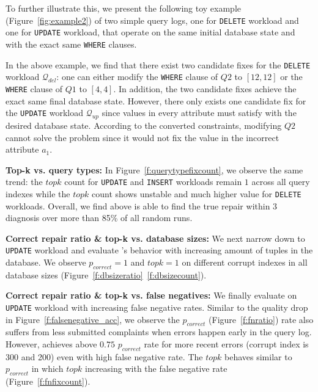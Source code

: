 To further illustrate this, we present the following toy example (Figure~\ref{fig:example2}) of two simple query logs, one for \texttt{DELETE} workload and one for \texttt{UPDATE} workload, that operate on the same initial database state and with the exact same \texttt{WHERE} clauses. 

In the above example, we find that there exist two candidate fixes for the \texttt{DELETE} workload $\mathcal{Q}_{del}$: one can either modify the \texttt{WHERE} clause of $Q2$ to $[12, 12]$ or the \texttt{WHERE} clause of $Q1$ to $[4, 4]$. In addition, the two candidate fixes achieve the exact same final database state. However, there only exists one candidate fix for the \texttt{UPDATE} workload $\mathcal{Q}_{up}$ since values in every attribute must satisfy with the desired database state. According to the converted constraints, modifying $Q2$ cannot solve the problem since it would not fix the value in the incorrect attribute $a_1$.  

\textbf{Top-k vs. query types: } In Figure~\ref{f:querytypefixcount}, we observe the same trend: the $topk$ count for \texttt{UPDATE} and \texttt{INSERT} workloads remain $1$ across all query indexes while the $topk$ count shows unstable and much higher value for \texttt{DELETE} workloads. Overall, we find \sys above is able to find the true repair within 3 diagnosis over more than 85\% of all random runs. 

\textbf{Correct repair ratio \& top-k vs. database sizes: } We next narrow down to \texttt{UPDATE} workload and evaluate \sys's behavior with increasing amount of tuples in the database. We observe $p_{correct} = 1$ and $topk = 1$ on different corrupt indexes in all database sizes (Figure~\ref{f:dbsizeratio}~\ref{f:dbsizecount}). 

\textbf{Correct repair ratio \& top-k vs. false negatives: } We finally evaluate \sys on \texttt{UPDATE} workload with increasing false negative rates. Similar to the quality drop in Figure~\ref{f:falsenegative_acc}, we observe the $p_{correct}$ (Figure~\ref{f:fnratio}) rate also suffers from less submitted complaints when errors happen early in the query log. However, \sys achieves above $0.75$ $p_{correct}$ rate for more recent errors (corrupt index is 300 and 200) even with high false negative rate. The $topk$ behaves similar to $p_{correct}$ in which $topk$ increasing with the false negative rate (Figure~\ref{f:fnfixcount}).  
\fi